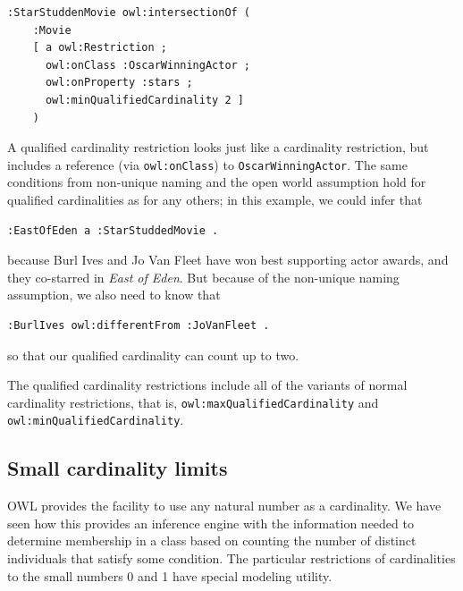 \begin{lstlisting}
:StarStuddenMovie owl:intersectionOf (
    :Movie 
    [ a owl:Restriction ;
      owl:onClass :OscarWinningActor ;
      owl:onProperty :stars ;
      owl:minQualifiedCardinality 2 ] 
    )
\end{lstlisting}

A
qualified cardinality restriction looks just like a cardinality
restriction, but includes a reference (via \texttt{owl:onClass}) to
\texttt{OscarWinningActor}. The same conditions from non-unique naming and the open world
assumption hold for qualified cardinalities as for any others; in this
example, we could infer that

\begin{lstlisting}
:EastOfEden a :StarStuddedMovie .
\end{lstlisting}

because Burl Ives and Jo Van Fleet have won best supporting actor awards, and they 
co-starred in \emph{East of Eden}.  But because of the non-unique naming assumption,
we also need to know that

\begin{lstlisting}
:BurlIves owl:differentFrom :JoVanFleet . 
\end{lstlisting}

so that our qualified cardinality can count up to two. 

The qualified cardinality
restrictions include all of the variants of normal cardinality
restrictions, that is, \texttt{owl:maxQualifiedCardinality} and
\texttt{owl:minQualifiedCardinality}.

\subsection{Small cardinality limits}

OWL provides the facility to use any natural number as a cardinality. We
have seen how this provides an inference engine with the information
needed to determine membership in a class based on counting the number
of distinct individuals that satisfy some condition. The particular
restrictions of cardinalities to the small numbers 0 and 1 have
special modeling utility.

